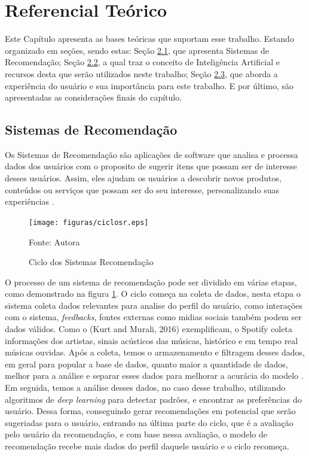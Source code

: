 \chapter[Referencial Teórico]{Referencial Teórico}
Este Capítulo apresenta as bases teóricas que suportam esse trabalho. Estando organizado em seções, sendo estas:
Seção \hyperref[sec:sisrec]{2.1}, que apresenta Sistemas de Recomendação; Seção \hyperref[sec:ia]{2.2}, a qual traz 
o conceito de Inteligência Artificial e recursos desta que serão utilizados neste trabalho; Seção \hyperref[sec:expus]{2.3},
que aborda a experiência do usuário e sua importância para este trabalho. E por último, são apresentadas as considerações finais
do capítulo.

\section{Sistemas de Recomendação}\label{sec:sisrec}

Os Sistemas de Recomendação são aplicações de software que analisa e processa dados dos usuários com o proposito de 
sugerir itens que possam ser de interesse desses usuários. Assim, eles ajudam os usuários a descobrir novos produtos, 
conteúdos ou serviços que possam ser do seu interesse, personalizando suas experiências \cite{pham2019recommendation}.

\begin{figure}[h]
    \centering
    \texttt{[image: figuras/ciclosr.eps]}
    \caption{Ciclo dos Sistemas Recomendação}
    \label{fig:ciclosr}
    \small Fonte: Autora
\end{figure}

O processo de um sistema de recomendação pode ser dividido em várias etapas, como demonstrado na figura 
\hyperref[fig:ciclosr]{1}. O ciclo começa na coleta de dados, nesta etapa o sistema coleta dados relevantes para analise
do perfil do usuário, como interações com o sistema, \textit{feedbacks}, fontes externas como midias sociais também podem ser
dados válidos. Como o (Kurt and Murali, 2016) exemplificam, o Spotify coleta informações dos artistas, sinais acústicos das músicas,
histórico e em tempo real músicas ouvidas.
Após a coleta, temos o armazenamento e filtragem desses dados, em geral para popular a base de dados, quanto maior a quantidade de dados,
melhor para a análise e separar esses dados para melhorar a acurácia do modelo \cite{pham2019recommendation}. Em seguida, 
temos a análise desses dados, no caso desse trabalho, utilizando algoritmos de \textit{deep learning} para detectar padrões,
e encontrar as preferências do usuário. Dessa forma, conseguindo gerar recomendações em potencial que serão sugeriadas para o usuário,
entrando na última parte do ciclo, que é a avaliação pelo usuário da recomendação, e com base nessa avaliação, o modelo 
de recomendação recebe mais dados do perfil daquele usuário e o ciclo recomeça.

